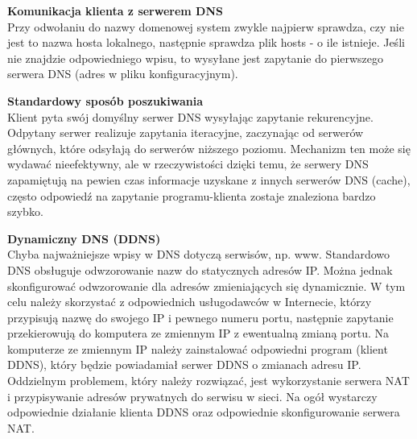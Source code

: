 \documentclass[../main.tex]{subfiles}
\begin{document}
        \textbf{Komunikacja klienta z serwerem DNS}\\
        Przy odwołaniu do nazwy domenowej system zwykle najpierw sprawdza, czy nie jest to
        nazwa hosta lokalnego, następnie sprawdza plik hosts - o ile istnieje. Jeśli nie znajdzie odpowiedniego wpisu, to
        wysyłane jest zapytanie do pierwszego serwera DNS (adres w pliku
        konfiguracyjnym).

        \textbf{Standardowy sposób poszukiwania}\\
        Klient pyta swój domyślny serwer DNS wysyłając zapytanie rekurencyjne.
        Odpytany serwer realizuje zapytania iteracyjne, zaczynając od serwerów głównych, które
        odsyłają do serwerów niższego poziomu.
        Mechanizm ten może się wydawać nieefektywny, ale w rzeczywistości dzięki temu, że
        serwery DNS zapamiętują na pewien czas informacje uzyskane z innych serwerów DNS
        (cache), często odpowiedź na zapytanie programu-klienta zostaje znaleziona bardzo szybko.

        \textbf{Dynamiczny DNS (DDNS)}\\
        Chyba najważniejsze wpisy w DNS dotyczą serwisów, np. www. Standardowo DNS obsługuje
        odwzorowanie nazw do statycznych adresów IP. Można jednak skonfigurować odwzorowanie dla adresów zmieniających się
        dynamicznie. W tym celu należy skorzystać z odpowiednich usługodawców w Internecie,
        którzy przypisują nazwę do swojego IP i pewnego numeru portu, następnie zapytanie
        przekierowują do komputera ze zmiennym IP z ewentualną zmianą portu. Na komputerze ze zmiennym IP należy
        zainstalować odpowiedni program (klient DDNS), który będzie powiadamiał serwer DDNS o
        zmianach adresu IP.
        Oddzielnym problemem, który należy rozwiązać, jest wykorzystanie serwera NAT i
        przypisywanie adresów prywatnych do serwisu w sieci. Na ogół wystarczy odpowiednie
        działanie klienta DDNS oraz odpowiednie skonfigurowanie serwera NAT.
\end{document}
